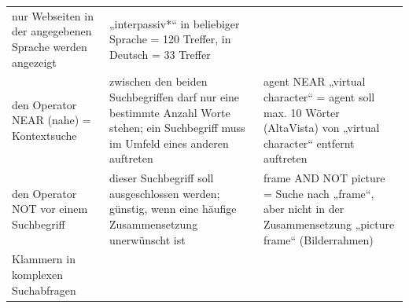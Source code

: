 \documentclass[]{book}
\theoremstyle{definition}
\theoremstyle{definition}
\theoremstyle{definition}
\theoremstyle{remark}
\begin{document}
\begin{longtable}[]{@{}lll@{}}
\begin{minipage}[t]{0.27\columnwidth}
nur Webseiten in der angegebenen Sprache werden angezeigt
\vspace{5mm}\strut
\end{minipage} & \begin{minipage}[t]{0.33\columnwidth}\raggedright\strut
„interpassiv*`` in beliebiger Sprache = 120 Treffer, in Deutsch = 33
Treffer \vspace{5mm}\strut
\end{minipage}\tabularnewline
\begin{minipage}[t]{0.31\columnwidth}\raggedright\strut
den Operator NEAR (nahe) = Kontextsuche \vspace{5mm}\strut
\end{minipage} & \begin{minipage}[t]{0.27\columnwidth}\raggedright\strut
zwischen den beiden Suchbegriffen darf nur eine bestimmte Anzahl Worte
stehen; ein Suchbegriff muss im Umfeld eines anderen auftreten
\vspace{5mm}\strut
\end{minipage} & \begin{minipage}[t]{0.33\columnwidth}\raggedright\strut
agent NEAR „virtual character`` = agent soll max. 10 Wörter (AltaVista)
von „virtual character`` entfernt auftreten \vspace{5mm}\strut
\end{minipage}\tabularnewline
\begin{minipage}[t]{0.31\columnwidth}\raggedright\strut
den Operator NOT vor einem Suchbegriff \vspace{5mm}\strut
\end{minipage} & \begin{minipage}[t]{0.27\columnwidth}\raggedright\strut
dieser Suchbegriff soll ausgeschlossen werden; günstig, wenn eine
häufige Zusammensetzung unerwünscht ist \vspace{5mm}\strut
\end{minipage} & \begin{minipage}[t]{0.33\columnwidth}\raggedright\strut
frame AND NOT picture = Suche nach „frame``, aber nicht in der
Zusammensetzung „picture frame`` (Bilderrahmen) \vspace{5mm}\strut
\end{minipage}\tabularnewline
\begin{minipage}[t]{0.31\columnwidth}\raggedright\strut
Klammern in komplexen Suchabfragen \vspace{5mm}\strut
\end{minipage} & \begin{minipage}[t]{0.27\columnwidth}\raggedright\strut

\end{minipage}
\end{longtable}
\end{document}
